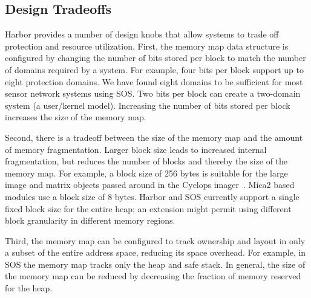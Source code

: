\subsection{Design Tradeoffs}
\label{sec:mmapdesignspace}
Harbor provides a number of design knobs that allow systems to trade
off protection and resource utilization.
%
First, the memory map data structure is configured by changing the
number of bits stored per block to match the number of domains
required by a system.
%
For example, four bits per block support up to eight protection
domains.
%
We have found eight domains to be sufficient for most sensor network
systems using SOS.
%
Two bits per block can create a two-domain system (a user/kernel
model).
%
Increasing the number of bits stored per block increases the size of
the memory map.
%
%
%
%
%

Second, there is a tradeoff between the size of the memory map and the
amount of memory fragmentation.
%
Larger block size leads to increased internal fragmentation, but
reduces the number of blocks and thereby the size of the memory map.
%
For example, a block size of 256 bytes is suitable for the large image
and matrix objects passed around in the Cyclops
imager~\cite{cyclops05sensys}.
%
Mica2 based modules use a block size of 8 bytes.
%
Harbor and SOS currently support a single fixed block size for the
entire heap; an extension might permit using different block
granularity in different memory regions.
%

Third, the memory map can be configured to track ownership and layout
in only a subset of the entire address space, reducing its space
overhead. 
%
%
For example, in SOS the memory map tracks only the heap and safe
stack.
%
%
%
In general, the size of the memory map can be reduced by decreasing
the fraction of memory reserved for the heap.
%
%






